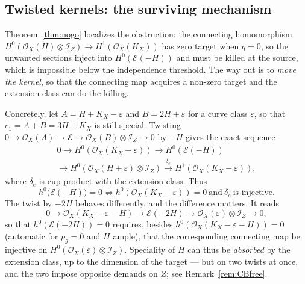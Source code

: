 \documentclass{amsart}
\theoremstyle{definition}
\newcommand{\OO}{\mathcal{O}}
\newcommand{\EE}{\mathcal{E}}
\newcommand{\II}{\mathcal{I}}
\begin{document}
\subsection{Twisted kernels: the surviving mechanism}\label{subsec:twisted}
Theorem~\ref{thm:nogo} localizes the obstruction: the connecting homomorphism $H^0(\OO_X(H)\otimes\II_Z)\to H^1(\OO_X(K_X))$ has zero target when $q=0$, so the unwanted sections inject into $H^0(\EE(-H))$ and must be killed at the source, which is impossible below the independence threshold. The way out is to \emph{move the kernel}, so that the connecting map acquires a non-zero target and the extension class can do the killing.

Concretely, let $A=H+K_X-\varepsilon$ and $B=2H+\varepsilon$ for a curve class $\varepsilon$, so that $c_1=A+B=3H+K_X$ is still special. Twisting $0\to\OO_X(A)\to\EE\to\OO_X(B)\otimes\II_Z\to0$ by $-H$ gives the exact sequence
\begin{multline*}
0\to H^0(\OO_X(K_X-\varepsilon))\to H^0(\EE(-H))\\
\to H^0(\OO_X(H+\varepsilon)\otimes\II_Z)
\xrightarrow{\ \delta_e\ } H^1(\OO_X(K_X-\varepsilon)),
\end{multline*}
where $\delta_e$ is cup product with the extension class. Thus
\[
h^0\bigl(\EE(-H)\bigr)=0
\iff
h^0(\OO_X(K_X-\varepsilon))=0\ \text{and}\ \delta_e\ \text{is injective}.
\]
The twist by $-2H$ behaves differently, and the difference matters. It reads
\[
0\to\OO_X(K_X-\varepsilon-H)\to\EE(-2H)\to\OO_X(\varepsilon)\otimes\II_Z\to0 ,
\]
so that $h^0(\EE(-2H))=0$ requires, besides $h^0(\OO_X(K_X-\varepsilon-H))=0$ (automatic for $p_g=0$ and $H$ ample), that the corresponding connecting map be injective on $H^0(\OO_X(\varepsilon)\otimes\II_Z)$. Speciality of $H$ can thus be \emph{absorbed} by the extension class, up to the dimension of the target --- but on two twists at once, and the two impose opposite demands on $Z$; see Remark~\ref{rem:CBfree}.
\end{document}
